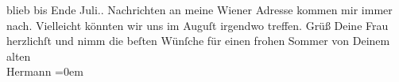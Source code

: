 \begin{ledgroupsized}[t]{13cm}
{{{                  blieb bis Ende Juli.}}}\label{K_L01601-2h}. Nachrichten an meine Wiener {\pb}Adresse kommen mir
               immer nach. Vielleicht könnten wir uns im Auguſt irgendwo treffen. Grüß Deine Frau herzlichſt und nimm die
               beſten Wünſche für einen frohen Sommer von \pend
           \pstart
           Deinem alten{\\[\baselineskip]}\spacefill\mbox{Hermann}\pend
           \leftskip=0em{}
         
         \endnumbering{}\end{ledgroupsized}  \newcommand{\dateiname}{L01601}\newcommand{\titel}{Hermann Bahr an Arthur Schnitzler, 21. 6. 1906}\newcommand{\editorInnen}{ Kurt Ifkovits,  Martin Anton Müller}
      